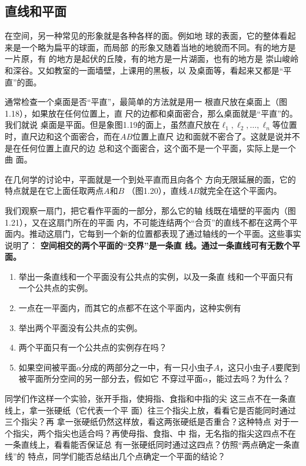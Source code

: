 \subsection{直线和平面}
在空间，另一种常见的形象就是各种各样的面。例如地
球的表面，它的整体看起来是一个略为扁平的球面，而局部
的形象又随着当地的地貌而不同。有的地方是一片原，有
的地方是起伏的丘陵，有的地方是一片湖面，也有的地方是
崇山峻岭和深谷。又如教室的一面墙壁，上课用的黑板，以
及桌面等，看起来又都是“平直”的面。

通常检查一个桌面是否“平直”，最简单的方法就是用一
根直尺放在桌面上（图1.18），如果放在任何位置上，直
尺的边都和桌面密合，那么桌面就是“平直”的。我们就说
桌面是平面。但是象图1.19的面上，虽然直尺放在$\ell_1,\ell_2,\ldots,\ell_n$等位置时，直尺边和这个面密合，而在$AB$位置上直尺
边和面就不密合了。这就是说并不是在任何位置上直尺的边
总和这个面密合，这个面不是一个平面，实际上是一个曲
面。

在几何学的讨论中，平面就是一个到处平直而且向各个
方向无限延展的面，它的特点就是在它上面任取两点$A$和$B$
（图1.20），直线$AB$就完全在这个平面内。


我们观察一扇门，把它看作平面的一部分，那么它的轴
线既在墙壁的平面内（图1.21），又在这扇门所在的平面
内，不可能连结两个“合页”的直线不都在这两个平面内。推动这扇门，它每到一个新的位置都表现了通过轴线的一个平面。这些事实说明了：
\textbf{空间相交的两个平面的“交界”是一条直
线。通过一条直线可有无数个平面。}

\begin{ex}
\begin{enumerate}
	\item 举出一条直线和一个平面没有公共点的实例，以及一条直
	线和一个平面只有一个公共点的实例。
	\item 一点在一平面内，而其它的点都不在这个平面内，这种实例有\item 举出两个平面没有公共点的实例。
	\item 两个平面只有一个公共点的实例存在吗？
	\item 如果空间被平面$\alpha$分成的两部分之一中，有一只小虫子$A$，这只小虫子$A$要爬到	被平面所分空间的另一部分去，假如它
	不穿过平面$\alpha$，能过去吗？为什么？
\begin{center}
	\begin{tikzpicture}
		
	\end{tikzpicture}
\end{center}
\end{enumerate}
\end{ex}

同学们作这样一个实验，张开手指，使拇指、食指和中指的尖
这三点不在一条直线上，拿一张硬纸（它代表一个平
面）往三个指尖上放，看看它是否能同时通过三个指尖？再
拿一张硬纸仍然这样放，看这两张硬纸是否重合？这种特点
对于一个指尖，两个指尖也适合吗？再使母指、食指、中
指，无名指的指尖这四点不在一条直线上，看看能否保证总
有一张硬纸同时通过这四点？仿照“两点确定一条直线”的
特点，同学们能否总结出几个点确定一个平面的结论？

